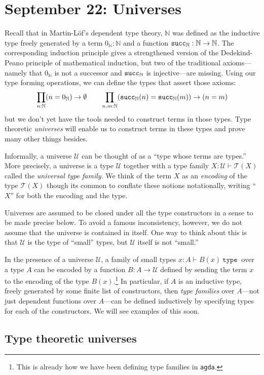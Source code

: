 \documentclass{amsart}
\theoremstyle{theorem}
\theoremstyle{definition}
\theoremstyle{remark}
\newcommand{\0}{\mathbbe{0}}
\newcommand{\1}{\mathbbe{1}}
\newcommand{\2}{\mathbbe{2}}
\newcommand{\3}{\mathbbe{3}}
\newcommand{\4}{\mathbbe{4}}
\newcommand{\univ}{{~\texttt{type}~}}
\newcommand{\term}[1]{{\textup{\texttt{#1}}}}
\newcommand{\bN}{{\mathbb{N}}}
\newcommand{\suc}{\term{succ}_{\bN}}
\newcommand{\UU}{\mathcal{U}}
\newcommand{\sT}{\mathcal{T}}
\begin{document}
\section*{September 22: Universes}

Recall that in Martin-L\"{o}f's dependent type theory, $\bN$ was defined as the inductive type freely generated by a term $0_\bN : \bN$ and a function $\suc :\bN \to \bN$. The corresponding induction principle gives a strengthened version of the Dedekind-Peano principle of mathematical induction, but two of the traditional axioms---namely that $0_\bN$ is not a successor and $\suc$ is injective---are missing. Using our type forming operations, we can define the types that assert those axioms:
\[ \prod_{n : \bN} (n = 0_\bN) \to \emptyset \qquad \prod_{n,m : \bN} (\suc(n) = \suc(m)) \to (n = m)\]
but we don't yet have the tools needed to construct terms in those types. Type theoretic \emph{universes} will enable us to construct terms in these types and prove many other things besides.

Informally, a universe $\UU$ can be thought of as a ``type whose terms are types.'' More precisely, a universe is a type $\UU$ together with a type family $X : \UU \vdash \sT(X)$ called the \emph{universal type family}. We think of the term $X$ as an \emph{encoding} of the type $\sT(X)$ though its common to conflate these notions notationally, writing ``$X$'' for both the encoding and the type.

Universes are assumed to be closed under all the type constructors in a sense to be made precise below. To avoid a famous inconsistency, however, we do not assume that the universe is contained in itself. One way to think about this is that $\UU$ is the type of ``small'' types, but $\UU$ itself is not ``small.''

In the presence of a universe $\UU$, a family of small types $x : A \vdash B(x) \univ$ over a type $A$ can be encoded by a function $B \colon A \to \UU$ defined by sending the term $x$ to the encoding of the type $B(x)$.\footnote{This is already how we have been defining type families in \texttt{agda}.} In particular, if $A$ is an inductive type, freely generated by some finite list of constructors, then \emph{type families} over $A$---not just dependent functions over $A$---can be defined inductively by specifying types for each of the constructors. We will see examples of this soon.

\subsection*{Type theoretic universes}
\end{document}
